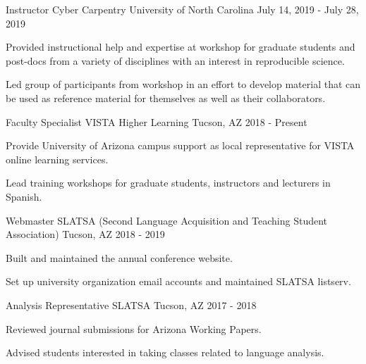 \begin{cventries}
\cventry
{Instructor} %
{Cyber Carpentry} %
{University of North Carolina} %
{July 14, 2019 - July 28, 2019} %
{ %
\begin{cvitems}
\item {Provided instructional help and expertise at workshop for graduate students and post-docs from a variety of disciplines with an interest in reproducible science.}
\item {Led group of participants from workshop in an effort to develop material that can be used as reference material for themselves as well as their collaborators.}
\end{cvitems}
}


\cventry
{Faculty Specialist} %
{VISTA Higher Learning} %
{Tucson, AZ} %
{2018 - Present} %
{ %
\begin{cvitems}
\item {Provide University of Arizona campus support as local representative for VISTA online learning services.}
\item {Lead training workshops for graduate students, instructors and lecturers in Spanish.}
\end{cvitems}
}


\cventry
{Webmaster} %
{SLATSA  (Second Language Acquisition and Teaching Student Association)} %
{Tucson, AZ} %
{2018 - 2019} %
{ %
\begin{cvitems}
\item {Built and maintained the annual conference website.}
\item {Set up university organization email accounts and maintained SLATSA listserv.}
\end{cvitems}
}


\cventry
{Analysis Representative} %
{SLATSA } %
{Tucson, AZ} %
{2017 - 2018} %
{ %
\begin{cvitems}
\item {Reviewed journal submissions for Arizona Working Papers.}
\item {Advised students interested in taking classes related to language analysis.}
\end{cvitems}
}


\end{cventries}